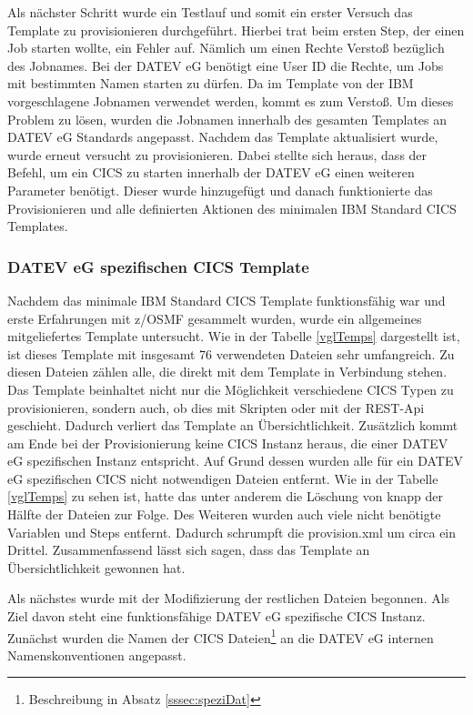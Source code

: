 Als nächster Schritt wurde ein Testlauf und somit ein erster Versuch das Template zu provisionieren durchgeführt.
Hierbei trat beim ersten Step, der einen Job starten wollte, ein Fehler auf.
Nämlich um einen Rechte Verstoß bezüglich des Jobnames.
Bei der DATEV eG benötigt eine User ID die Rechte, um Jobs mit bestimmten Namen starten zu dürfen.
Da im Template von der IBM vorgeschlagene Jobnamen verwendet werden, kommt es zum Verstoß.
Um dieses Problem zu lösen, wurden die Jobnamen innerhalb des gesamten Templates an DATEV eG Standards angepasst.
Nachdem das Template aktualisiert wurde, wurde erneut versucht zu provisionieren.
Dabei stellte sich heraus, dass der Befehl, um ein CICS zu starten innerhalb der DATEV eG einen weiteren Parameter benötigt.
Dieser wurde hinzugefügt und danach funktionierte das Provisionieren und alle definierten Aktionen des minimalen IBM Standard CICS Templates.

\subsubsection{DATEV eG spezifischen CICS Template}
Nachdem das minimale IBM Standard CICS Template funktionsfähig war und erste Erfahrungen mit z/OSMF gesammelt wurden, wurde ein allgemeines mitgeliefertes Template untersucht.
Wie in der Tabelle \ref{vglTemps} dargestellt ist, ist dieses Template mit insgesamt 76 verwendeten Dateien sehr umfangreich.
Zu diesen Dateien zählen alle, die direkt mit dem Template in Verbindung stehen.
Das Template beinhaltet nicht nur die Möglichkeit verschiedene CICS Typen zu provisionieren, sondern auch, ob dies mit Skripten oder mit der REST-Api geschieht.
Dadurch verliert das Template an Übersichtlichkeit.
Zusätzlich kommt am Ende bei der Provisionierung keine CICS Instanz heraus, die einer DATEV eG spezifischen Instanz entspricht.
Auf Grund dessen wurden alle für ein DATEV eG spezifischen CICS nicht notwendigen Dateien entfernt.
Wie in der Tabelle \ref{vglTemps} zu sehen ist, hatte das unter anderem die Löschung von knapp der Hälfte der Dateien zur Folge.
Des Weiteren wurden auch viele nicht benötigte Variablen und Steps entfernt.
Dadurch schrumpft die provision.xml um circa ein Drittel.
Zusammenfassend lässt sich sagen, dass das Template an Übersichtlichkeit gewonnen hat.

Als nächstes wurde mit der Modifizierung der restlichen Dateien begonnen.
Als Ziel davon steht eine funktionsfähige DATEV eG spezifische CICS Instanz.
Zunächst wurden die Namen der CICS Dateien\footnote{Beschreibung in Absatz \ref{sssec:speziDat}} an die DATEV eG internen Namenskonventionen angepasst.

